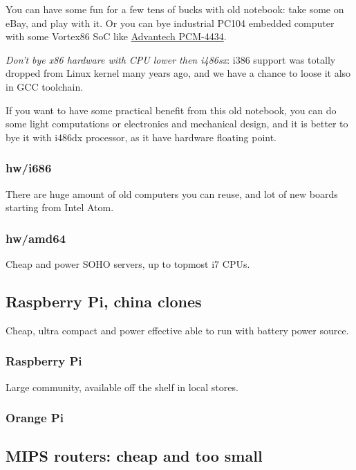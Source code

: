 You can have some fun for a few tens of bucks with old notebook: take some on
eBay, and play with it. Or you can bye industrial PC104 embedded computer with
some Vortex86 SoC like
\href{http://www.advantech.ru/products/1-2jkltu/pcm-3343/mod_645a1e17-167a-4476-b253-ca4cf2e19428}{Advantech PCM-4434}.

\emph{Don't bye x86 hardware with CPU lower then i486sx}: i386 support was
totally dropped from Linux kernel many years ago, and we have a chance to loose
it also in GCC toolchain.

If you want to have some practical benefit from this old notebook, you can do
some light computations or electronics and mechanical design, and it is better
to bye it with i486dx processor, as it have hardware floating point. 

\subsubsection{hw/i686}

There are huge amount of old computers you can reuse, and lot of new boards
starting from Intel Atom.

\subsubsection{hw/amd64}

Cheap and power SOHO servers, up to topmost i7 CPUs.

\subsection{Raspberry Pi, china clones}

Cheap, ultra compact and power effective able to run with battery power source.

\subsubsection{Raspberry Pi}

Large community, available off the shelf in local stores.

\subsubsection{Orange Pi} 

\subsection{MIPS routers: cheap and too small}

